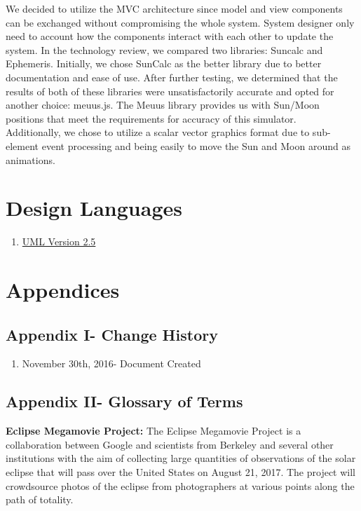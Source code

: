\documentclass[10pt, onecolumn, draftclsnofoot, letterpaper, compsoc]{IEEEtran}
\begin{document}
We decided to utilize the MVC architecture since model and
view components can be exchanged without compromising the
whole system. System designer only need to account how the
components interact with each other to update the system.
In the technology review, we compared two libraries: Suncalc
and Ephemeris. Initially, we chose SunCalc as the better
library due to better documentation and ease of use. After
further testing, we determined that the results of both of these libraries were
unsatisfactorily accurate and opted for another choice: meuus.js. The Meuus library
provides us with Sun/Moon positions that meet the requirements for accuracy of
this simulator.  \\

Additionally, we chose to utilize a scalar vector graphics
format due to sub-element event processing and being easily
to move the Sun and Moon around as animations. \\

\section{Design Languages}

\begin{enumerate}
    \item \href{http://www.omg.org/spec/UML/2.5}{UML Version 2.5}
\end{enumerate}


\newpage
\section{Appendices}

\subsection{Appendix I- Change History}

\begin{enumerate}
\item November 30th, 2016- Document Created \\
\end{enumerate}

\subsection{Appendix II- Glossary of Terms}

\textbf{Eclipse Megamovie Project:}
The Eclipse Megamovie Project is a collaboration between Google
and scientists from Berkeley and several other institutions with the
aim of collecting large quantities of observations of the solar eclipse
that will pass over the United States on August 21, 2017. The project
will crowdsource photos of the eclipse from photographers at various
points along the path of totality. \\
\end{document}
